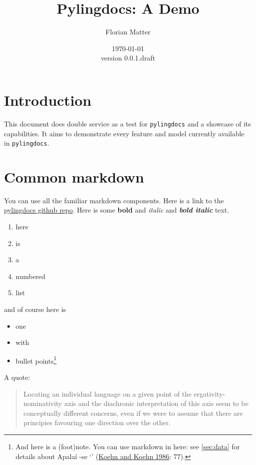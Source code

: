 \documentclass{article}
\title{Pylingdocs: A Demo}
\author{Florian Matter}
\date{\today\\version 0.0.1.draft}
\begin{document}
\maketitle

\tableofcontents


\section{\texorpdfstring{Introduction \label{sec:intro}}{Introduction }}

This document does double service as a test for \texttt{pylingdocs} and
a showcase of its capabilities. It aims to demonstrate every feature and
model currently available in \texttt{pylingdocs}.

\section{Common markdown}

You can use all the familiar markdown components. Here is a link to the
\href{https://github.com/fmatter/pylingdocs/}{pylingdocs github repo}.
Here is some \textbf{bold} and \emph{italic} and \textbf{\emph{bold
italic}} text.

\begin{enumerate}
\def\labelenumi{\arabic{enumi}.}
\tightlist
\item
  here
\item
  is
\item
  a
\item
  numbered
\item
  list
\end{enumerate}

and of course here is

\begin{itemize}
\tightlist
\item
  one
\item
  with
\item
  bullet points\footnote{And here is a (foot)note. You can use markdown
    in here: see \cref{sec:data} for details about Apalaí -se `'
    (\protect\hyperlink{source-koehn1986apalai}{Koehn and Koehn 1986}:
    77).}
\end{itemize}

A quote:

\begin{quote}
Locating an individual language on a given point of the
ergativity-nominativity axis and the diachronic interpretation of this
axis seem to be conceptually different concerns, even if we were to
assume that there are principies favouring one direction over the other.
\parencites[71]{alvarez1998split}
\end{quote}
\end{document}
